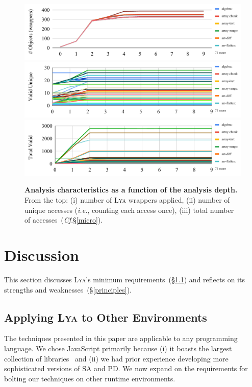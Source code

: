 \documentclass[letterpaper,twocolumn,10pt]{article}
\def\ie{{\em i.e.}, }
\newcommand{\cf}[1]{(\emph{Cf}.\S\ref{#1})}
\newcommand{\sx}[1]{(\S\ref{#1})}
\newcommand{\sys}{{\scshape Lya}\xspace}
\begin{document}
\begin{figure}[t]
  \centering
  \includegraphics[width=\columnwidth]{./figs/lya_n_obj}
  \includegraphics[width=\columnwidth]{./figs/lya_unique_valid}
  \includegraphics[width=\columnwidth]{./figs/lya_total_valid}
  \caption{
    \textbf{Analysis characteristics as a function of the analysis depth.}
    From the top:
    (i) number of \sys wrappers applied,
    (ii) number of unique accesses (\ie counting each access once),
    (iii) total number of accesses~\cf{micro}.
    \vspace{-5mm}
  }
  \label{fig:objects}
\end{figure}

\section{Discussion}
\label{diss}

This section discusses \sys's minimum requirements~\sx{reqs} and reflects on its strengths and weaknesses~\sx{principles}.

\subsection{Applying \sys to Other Environments}
\label{reqs}

The techniques presented in this paper are applicable to any programming language.
We chose JavaScript %
primarily because
  (i) it boasts the largest collection of libraries~\cite{modulecounts} and
	(ii) we had prior experience developing more sophisticated versions of SA and PD.
We now expand on the requirements for bolting our techniques on other runtime environments.
\end{document}
